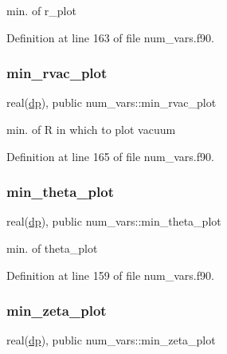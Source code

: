min. of {\ttfamily r\+\_\+plot} 



Definition at line 163 of file num\+\_\+vars.\+f90.

\mbox{\label{namespacenum__vars_a9f2ea40c94edef5e9f10f3b5d154c2a3}} 
\subsubsection{\texorpdfstring{min\+\_\+rvac\+\_\+plot}{min\_rvac\_plot}}
{\footnotesize\ttfamily real(\hyperlink{namespacenum__vars_a03802aa2bd86439d7a9370836fabf3f2}{dp}), public num\+\_\+vars\+::min\+\_\+rvac\+\_\+plot}



min. of {\ttfamily R} in which to plot vacuum 



Definition at line 165 of file num\+\_\+vars.\+f90.

\mbox{\label{namespacenum__vars_a2085f22558c1b4a349b5ad1b6abfe09f}} 
\subsubsection{\texorpdfstring{min\+\_\+theta\+\_\+plot}{min\_theta\_plot}}
{\footnotesize\ttfamily real(\hyperlink{namespacenum__vars_a03802aa2bd86439d7a9370836fabf3f2}{dp}), public num\+\_\+vars\+::min\+\_\+theta\+\_\+plot}



min. of {\ttfamily theta\+\_\+plot} 



Definition at line 159 of file num\+\_\+vars.\+f90.

\mbox{\label{namespacenum__vars_a773a55cfd780f1f9db69887fdf48b0a5}} 
\subsubsection{\texorpdfstring{min\+\_\+zeta\+\_\+plot}{min\_zeta\_plot}}
{\footnotesize\ttfamily real(\hyperlink{namespacenum__vars_a03802aa2bd86439d7a9370836fabf3f2}{dp}), public num\+\_\+vars\+::min\+\_\+zeta\+\_\+plot}



